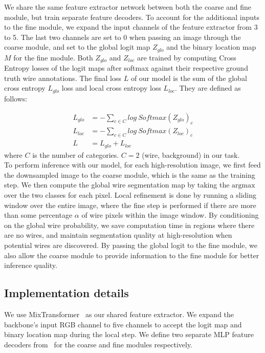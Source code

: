We share the same feature extractor network between both the coarse and fine module, but train separate feature decoders. To account for the additional inputs to the fine module, we expand the input channels of the feature extractor from 3 to 5. The last two channels are set to 0 when passing an image through the coarse module, and set to the global logit map $Z_{glo}$ and the binary location map $M$ for the fine module. Both $Z_{glo}$ and $Z_{loc}$ are trained by computing Cross Entropy losses of the logit maps after softmax against their respective ground truth wire annotations. The final loss $L$ of our model is the sum of the global cross entropy $L_{glo}$ loss and local cross entropy loss $L_{loc}$. They are defined as follows:

\begin{equation}
\begin{aligned}
    L_{glo} &= -\sum_{c\in C}log\ Softmax(Z_{glo})_c \\
    L_{loc} &= -\sum_{c\in C}log\ Softmax(Z_{loc})_c \\
    L &= L_{glo} + L_{loc}
\end{aligned}
\end{equation}
where $C$ is the number of categories. $C=2$ (wire, background) in our task.\\

To perform inference with our model, for each high-resolution image, we first feed the downsampled image to the coarse module, which is the same as the training step. We then compute the global wire segmentation map by taking the $\mathrm{argmax}$ over the two classes for each pixel. Local refinement is done by running a sliding window over the entire image, where the fine step is performed if there are more than some percentage $\alpha$ of wire pixels within the image window. By conditioning on the global wire probability, we save computation time in regions where there are no wires, and maintain segmentation quality at high-resolution when potential wires are discovered. By passing the global logit to the fine module, we also allow the coarse module to provide information to the fine module for better inference quality.

\subsection{Implementation details}

We use MixTransformer~\cite{segformer} as our shared feature extractor. We expand the backbone's input RGB channel to five channels to accept the logit map and binary location map during the local step. We define two separate MLP feature decoders from~\cite{segformer} for the coarse and fine modules respectively.

